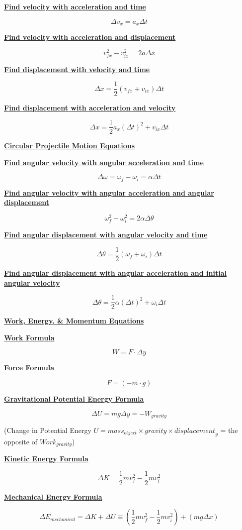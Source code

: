 \documentclass[12pt, letterpaper]{article}
\begin{document}
\normalsize{\centerline{\textbf{\underline{Find velocity with acceleration and time}}}}
\[\Delta v_x = a_x \Delta t\]

\centerline{\textbf{\underline{Find velocity with acceleration and displacement}}}
\[v^2_{fx} - v^2_{ix} = 2a \Delta x\]

\centerline{\textbf{\underline{Find displacement with velocity and time}}}
\[\Delta x = \frac{1}{2} (v_{fx} + v_{ix}) \Delta t\]

\centerline{\textbf{\underline{Find displacement with acceleration and velocity}}}
\[\Delta x = \frac{1}{2} a_x (\Delta t)^2 + v_{ix} \Delta t\]

\newpage

\Large{\centerline{\textbf{\underline{Circular Projectile Motion Equations}}}}
\vspace{1em}

\normalsize{\centerline{\textbf{\underline{Find angular velocity with angular acceleration and time}}}}
\[\Delta \omega = \omega_f - \omega_i = \alpha \Delta t\]

\centerline{\textbf{\underline{Find angular velocity with angular acceleration and angular displacement}}}
\[\omega^2_{f} - \omega^2_{i} = 2 \alpha \Delta \theta \]

\centerline{\textbf{\underline{Find angular displacement with angular velocity and time}}}
\[\Delta \theta = \frac{1}{2} (\omega_{f} + \omega_{i}) \Delta t\]

\centerline{\textbf{\underline{Find angular displacement with angular acceleration and initial angular velocity}}}
\[\Delta \theta = \frac{1}{2} \alpha (\Delta t)^2 + \omega_{i} \Delta t\]

\newpage


\Large{\centerline{\textbf{\underline{Work, Energy, \& Momentum Equations}}}}
\vspace{1em}

\normalsize{\centerline{\textbf{\underline{Work Formula}}}}
\[W = F \cdot \Delta y\]

\normalsize{\centerline{\textbf{\underline{Force Formula}}}}
\[F = (-m \cdot g)\]

\normalsize{\centerline{\textbf{\underline{Gravitational Potential Energy Formula}}}}
\[\Delta U = mg \Delta y = -W_{gravity}\]
\small{\centerline{(Change in Potential Energy $U = {mass}_{object} \times {gravity} \times {displacement}_y$ = the opposite of ${Work}_{gravity}$)}}

\normalsize{\centerline{\textbf{\underline{Kinetic Energy Formula}}}}
\[\Delta K = \frac{1}{2}mv^2_f - \frac{1}{2}mv^2_i\]

\normalsize{\centerline{\textbf{\underline{Mechanical Energy Formula}}}}
\[\Delta E_{mechanical} = \Delta K + \Delta U \equiv (\frac{1}{2}mv^2_f - \frac{1}{2}mv^2_i) + (mg \Delta x)\]
\end{document}
